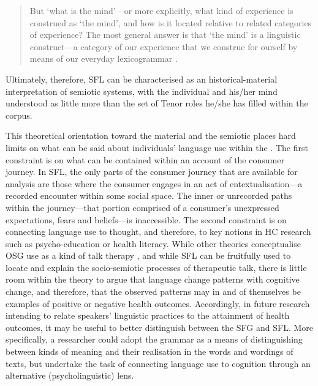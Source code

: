 \begin{quote}\singlespacing\small
But `what is the mind'---or more explicitly, what kind of experience is construed as `the mind', and how is it located relative to related categories of experience? The most general answer is that `the mind' is a linguistic construct---a category of our experience that we construe for ourself by means of our everyday \gls{lexicogrammar} \parencite*[p.~327]{matthiessen1998construing}.
\end{quote}
%
Ultimately, therefore, \gls{SFL} can be characterised as an historical\hyp{}material interpretation of semiotic systems, with the individual and his\slash her mind understood as little more than the set of Tenor roles he\slash she has filled within the \gls{corpus}.

This theoretical orientation toward the material and the semiotic \cite{thompson2001interview} places hard limits on what can be said about individuals' language use within the . The first constraint is on what can be contained within an account of the consumer journey. In \gls{SFL}, the only parts of the \gls{consumer} journey that are available for analysis are those where the \gls{consumer} engages in an act of entextualisation---a recorded encounter within some social space. The inner or unrecorded paths within the journey---that portion comprised of a consumer's unexpressed expectations, fears and beliefs---is inaccessible. The second constraint is on connecting language use to thought, and therefore, to key notions in \gls{HC} research such as psycho\hyp{}education or health literacy. While other theories conceptualise \gls{OSG} use as a kind of talk therapy \cite{kaufman2016producing}, and while \gls{SFL} can be fruitfully used to locate and explain the socio\hyp{}semiotic processes of therapeutic talk, there is little room within the theory to argue that language change patterns with cognitive change, and therefore, that the observed patterns may in and of themselves be examples of positive or negative health outcomes. Accordingly, in future research intending to relate speakers' linguistic practices to the attainment of health outcomes, it may be useful to better distinguish between the \gls{SFG} and \gls{SFL}. More specifically, a researcher could adopt the grammar as a means of distinguishing between kinds of meaning and their realisation in the words and wordings of texts, but undertake the task of connecting language use to cognition through an alternative (psycholinguistic) lens.

